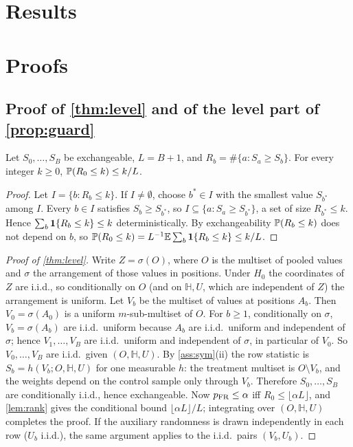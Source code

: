 \documentclass[11pt,a4paper]{article}
\begin{document}
\section{Results}\label{sec:results}


\appendix
\section{Proofs}\label{app:proofs}

\subsection{Proof of \texorpdfstring{\cref{thm:level}}{Theorem 3.2} and of the level part of \texorpdfstring{\cref{prop:guard}}{Proposition 3.16}}\label{app:level}

\begin{lemma}\label{lem:rank}
Let $S_0,\dots,S_B$ be exchangeable, $L=B+1$, and $R_b=\#\{a:S_a\ge S_b\}$. For every integer $k\ge0$, $\P(R_0\le k)\le k/L$.
\end{lemma}
\begin{proof}
Let $I=\{b:R_b\le k\}$. If $I\neq\emptyset$, choose $b^\ast\in I$ with the smallest value $S_{b^\ast}$ among $I$. Every $b\in I$ satisfies $S_b\ge S_{b^\ast}$, so $I\subseteq\{a:S_a\ge S_{b^\ast}\}$, a set of size $R_{b^\ast}\le k$. Hence $\sum_b\1\{R_b\le k\}\le k$ deterministically. By exchangeability $\P(R_b\le k)$ does not depend on $b$, so $\P(R_0\le k)=L^{-1}\E\sum_b\1\{R_b\le k\}\le k/L$.
\end{proof}

\begin{proof}[Proof of \cref{thm:level}]
Write $Z=\sigma(O)$, where $O$ is the multiset of pooled values and $\sigma$ the arrangement of those values in positions. Under $H_0$ the coordinates of $Z$ are i.i.d., so conditionally on $O$ (and on $\mathbb H,U$, which are independent of $Z$) the arrangement is uniform. Let $V_b$ be the multiset of values at positions $A_b$. Then $V_0=\sigma(A_0)$ is a uniform $m$-sub-multiset of $O$. For $b\ge1$, conditionally on $\sigma$, $V_b=\sigma(A_b)$ are i.i.d.\ uniform because $A_b$ are i.i.d.\ uniform and independent of $\sigma$; hence $V_1,\dots,V_B$ are i.i.d.\ uniform and independent of $\sigma$, in particular of $V_0$. So $V_0,\dots,V_B$ are i.i.d.\ given $(O,\mathbb H,U)$. By \cref{ass:sym}(ii) the row statistic is $S_b=h(V_b;O,\mathbb H,U)$ for one measurable $h$: the treatment multiset is $O\setminus V_b$, and the weights depend on the control sample only through $V_b$. Therefore $S_0,\dots,S_B$ are conditionally i.i.d., hence exchangeable. Now $p_{\rm FR}\le\alpha$ iff $R_0\le\lfloor\alpha L\rfloor$, and \cref{lem:rank} gives the conditional bound $\lfloor\alpha L\rfloor/L$; integrating over $(O,\mathbb H,U)$ completes the proof. If the auxiliary randomness is drawn independently in each row ($U_b$ i.i.d.), the same argument applies to the i.i.d.\ pairs $(V_b,U_b)$.
\end{proof}
\end{document}
